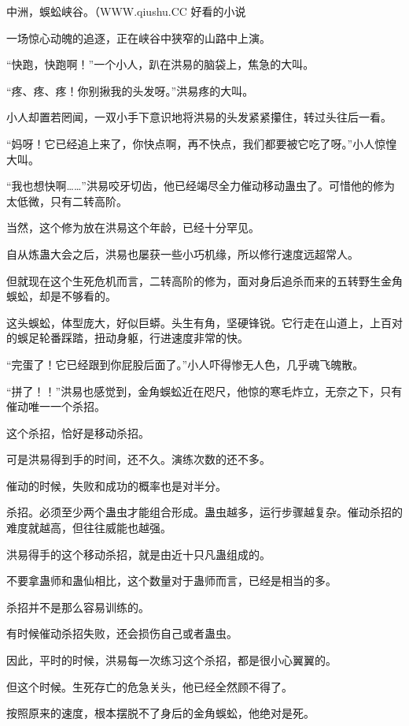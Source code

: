 
\begin{this_body}

中洲，蜈蚣峡谷。（WWW.qiushu.CC 好看的小说

一场惊心动魄的追逐，正在峡谷中狭窄的山路中上演。

“快跑，快跑啊！”一个小人，趴在洪易的脑袋上，焦急的大叫。

“疼、疼、疼！你别揪我的头发呀。”洪易疼的大叫。

小人却置若罔闻，一双小手下意识地将洪易的头发紧紧攥住，转过头往后一看。

“妈呀！它已经追上来了，你快点啊，再不快点，我们都要被它吃了呀。”小人惊惶大叫。

“我也想快啊……”洪易咬牙切齿，他已经竭尽全力催动移动蛊虫了。可惜他的修为太低微，只有二转高阶。

当然，这个修为放在洪易这个年龄，已经十分罕见。

自从炼蛊大会之后，洪易也屡获一些小巧机缘，所以修行速度远超常人。

但就现在这个生死危机而言，二转高阶的修为，面对身后追杀而来的五转野生金角蜈蚣，却是不够看的。

这头蜈蚣，体型庞大，好似巨蟒。头生有角，坚硬锋锐。它行走在山道上，上百对的蜈足轮番踩踏，扭动身躯，行进速度非常的快。

“完蛋了！它已经跟到你屁股后面了。”小人吓得惨无人色，几乎魂飞魄散。

“拼了！！”洪易也感觉到，金角蜈蚣近在咫尺，他惊的寒毛炸立，无奈之下，只有催动唯一一个杀招。

这个杀招，恰好是移动杀招。

可是洪易得到手的时间，还不久。演练次数的还不多。

催动的时候，失败和成功的概率也是对半分。

杀招。必须至少两个蛊虫才能组合形成。蛊虫越多，运行步骤越复杂。催动杀招的难度就越高，但往往威能也越强。

洪易得手的这个移动杀招，就是由近十只凡蛊组成的。

不要拿蛊师和蛊仙相比，这个数量对于蛊师而言，已经是相当的多。

杀招并不是那么容易训练的。

有时候催动杀招失败，还会损伤自己或者蛊虫。

因此，平时的时候，洪易每一次练习这个杀招，都是很小心翼翼的。

但这个时候。生死存亡的危急关头，他已经全然顾不得了。

按照原来的速度，根本摆脱不了身后的金角蜈蚣，他绝对是死。


\end{this_body}
